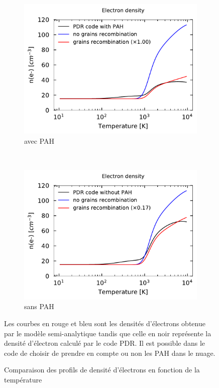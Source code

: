 \begin{figure}[!h]
    \centering
    \begin{subfigure}[t]{0.49\textwidth} %
        \centering \includegraphics[trim = {0 0 0 1cm},clip,width=1\textwidth]{figure/Cl/test_calc_PAH_e.pdf}
        \caption{avec PAH}
        \label{fig:Cl:model:recPAH}
    \end{subfigure}
    ~ 
    \begin{subfigure}[t]{0.49\textwidth}
        \centering \includegraphics[trim = {0 0 0 1cm},clip,width=1\textwidth]{figure/Cl/test_calc_e.pdf}
        \caption{sans PAH}
        \label{fig:Cl:model:recnoPAH}
    \end{subfigure}
    \caption{Comparaison des profils de densité d'électrons en fonction de la température}
    \begin{minipage}{\textwidth}
    Les courbes en rouge et bleu sont les densités d'électrons obtenue par le modèle semi-analytique tandis que celle en noir représente la densité d'électron calculé par le code PDR. Il est possible dans le code de choisir de prendre en compte ou non les PAH dans le nuage. 
    \end{minipage}
    \label{fig:Cl:model:rec}
\end{figure}



